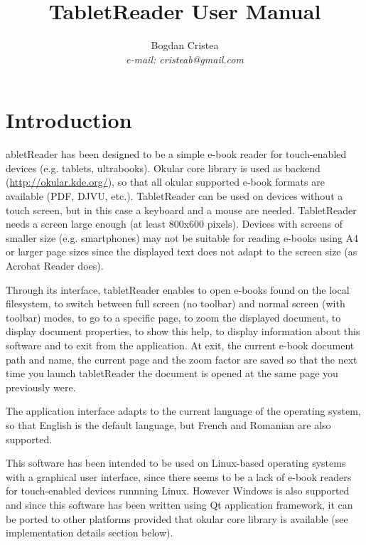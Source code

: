 \documentclass[journal,12pt]{IEEEtran}
\begin{document}
\title{TabletReader User Manual}
\author{Bogdan Cristea\\\textit{e-mail: cristeab@gmail.com}}

\maketitle

\section{Introduction}

abletReader has been designed to be a simple e-book reader for touch-enabled devices (e.g. tablets, ultrabooks). Okular core library is used as backend (\url{http://okular.kde.org/}), so that all okular supported e-book formats are available (PDF, DJVU, etc.). TabletReader can be used on devices without a touch screen, but in this case a keyboard and a mouse are needed. TabletReader needs a screen large enough (at least 800x600 pixels). Devices with screens of smaller size (e.g. smartphones) may not be suitable for reading e-books using A4 or larger page sizes since the displayed text does not adapt to the screen size (as Acrobat Reader does).

Through its interface, tabletReader enables to open e-books found on the local filesystem, to switch between full screen (no toolbar) and normal screen (with toolbar) modes, to go to a specific page, to zoom the displayed document, to display document properties, to show this help, to display information about this software and to exit from the application. At exit, the current e-book document path and name, the current page and the zoom factor are saved so that the next time you launch tabletReader the document is opened at the same page you previously were. 

The application interface adapts to the current language of the operating system, so that English is the default language, but French and Romanian are also supported.

This software has been intended to be used on Linux-based operating systems with a graphical user interface, since there seems to be a lack of e-book readers for touch-enabled devices runnning Linux. However Windows is also supported and since this software has been written using Qt application framework, it can be ported to other platforms provided that okular core library is available (see implementation details section below).
\end{document}
